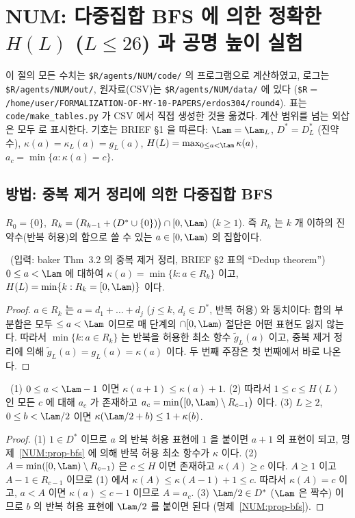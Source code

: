 \section{NUM: 다중집합 BFS 에 의한 정확한 $H(L)$ ($L\le 26$) 과 공명 높이 실험}\label{NUM:sec}

이 절의 모든 수치는 \texttt{\$R/agents/NUM/code/} 의 프로그램으로 계산하였고, 로그는
\texttt{\$R/agents/NUM/out/}, 원자료(CSV)는 \texttt{\$R/agents/NUM/data/} 에 있다
(\texttt{\$R}$=$\texttt{/home/user/FORMALIZATION-OF-MY-10-PAPERS/erdos304/round4}).
표는 \texttt{code/make\_tables.py} 가 CSV 에서 직접 생성한 것을 옮겼다.
계산 범위를 넘는 외삽은 모두 \HEUR 로 표시한다.
기호는 BRIEF \S1 을 따른다: $\Lam=\Lam_L$, $D^*=D^*_L$ (진약수), $\kappa(a)=\kappa_L(a)=g_L(a)$,
$H(L)=\max_{0\le a<\Lam}\kappa(a)$, $a_c=\min\{a:\kappa(a)=c\}$.

\subsection{방법: 중복 제거 정리에 의한 다중집합 BFS}\label{NUM:ssec-method}

\begin{definition}\label{NUM:def-Rk}
$R_0=\{0\}$, $R_k=\bigl(R_{k-1}+(D^*\cup\{0\})\bigr)\cap[0,\Lam)$ ($k\ge1$).
즉 $R_k$ 는 $k$ 개 이하의 진약수(반복 허용)의 합으로 쓸 수 있는 $a\in[0,\Lam)$ 의 집합이다.
\end{definition}

\begin{proposition}\label{NUM:prop-bfs}
\PROVED\ (입력: baker Thm~3.2 의 중복 제거 정리, BRIEF \S2 표의 ``Dedup theorem'')
$0\le a<\Lam$ 에 대하여 $\kappa(a)=\min\{k: a\in R_k\}$ 이고, $H(L)=\min\{k: R_k=[0,\Lam)\}$ 이다.
\end{proposition}
\begin{proof}
$a\in R_k$ 는 $a=d_1+\dots+d_j$ ($j\le k$, $d_i\in D^*$, 반복 허용) 와 동치이다: 합의 부분합은 모두
$\le a<\Lam$ 이므로 매 단계의 $\cap[0,\Lam)$ 절단은 어떤 표현도 잃지 않는다.
따라서 $\min\{k:a\in R_k\}$ 는 반복을 허용한 최소 항수 $\tilde g_L(a)$ 이고, 중복 제거 정리에 의해
$\tilde g_L(a)=g_L(a)=\kappa(a)$ 이다. 두 번째 주장은 첫 번째에서 바로 나온다.
\end{proof}

\begin{lemma}\label{NUM:lem-ac}
\PROVED\ (1) $0\le a<\Lam-1$ 이면 $\kappa(a+1)\le\kappa(a)+1$.
(2) 따라서 $1\le c\le H(L)$ 인 모든 $c$ 에 대해 $a_c$ 가 존재하고 $a_c=\min\bigl([0,\Lam)\setminus R_{c-1}\bigr)$ 이다.
(3) $L\ge2$, $0\le b<\Lam/2$ 이면 $\kappa(\Lam/2+b)\le 1+\kappa(b)$.
\end{lemma}
\begin{proof}
(1) $1\in D^*$ 이므로 $a$ 의 반복 허용 표현에 $1$ 을 붙이면 $a+1$ 의 표현이 되고, 명제~\ref{NUM:prop-bfs} 에 의해
반복 허용 최소 항수가 $\kappa$ 이다.
(2) $A=\min([0,\Lam)\setminus R_{c-1})$ 은 $c\le H$ 이면 존재하고 $\kappa(A)\ge c$ 이다. $A\ge1$ 이고
$A-1\in R_{c-1}$ 이므로 (1) 에서 $\kappa(A)\le\kappa(A-1)+1\le c$. 따라서 $\kappa(A)=c$ 이고,
$a<A$ 이면 $\kappa(a)\le c-1$ 이므로 $A=a_c$.
(3) $\Lam/2\in D^*$ ($\Lam$ 은 짝수) 이므로 $b$ 의 반복 허용 표현에 $\Lam/2$ 를 붙이면 된다 (명제~\ref{NUM:prop-bfs}).
\end{proof}

